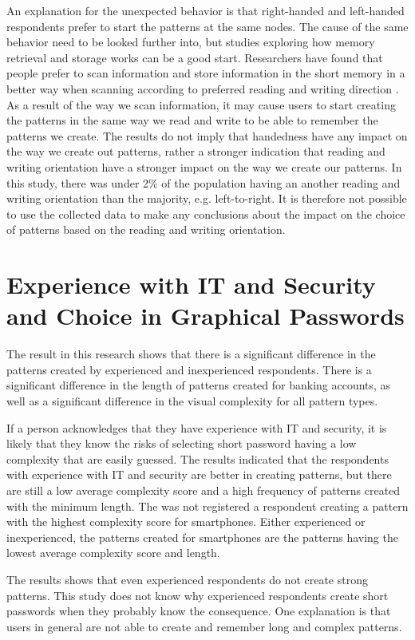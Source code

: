     An explanation for the unexpected behavior is that right-handed and left-handed respondents prefer to start the patterns at the same nodes. The cause of the same behavior need to be looked further into, but studies exploring how memory retrieval and storage works can be a good start. Researchers have found that people prefer to scan information and store information in the short memory in a better way when scanning according to preferred reading and writing direction \cite{Chan}. As a result of the way we scan information, it may cause users to start creating the patterns in the same way we read and write to be able to remember the patterns we create. The results do not imply that handedness have any impact on the way we create out patterns, rather a stronger indication that reading and writing orientation have a stronger impact on the way we create our patterns. In this study, there was under 2\% of the population having an another reading and writing orientation than the majority, e.g. left-to-right. It is therefore not possible to use the collected data to make any conclusions about the impact on the choice of patterns based on the reading and writing orientation.

  \section{Experience with IT and Security and Choice in Graphical Passwords}
    
    The result in this research shows that there is a significant difference in the patterns created by experienced and inexperienced respondents. There is a significant difference in the length of patterns created for banking accounts, as well as a significant difference in the visual complexity for all pattern types. 

    If a person acknowledges that they have experience with IT and security, it is likely that they know the risks of selecting short password having a low complexity that are easily guessed. The results indicated that the respondents with experience with IT and security are better in creating patterns, but there are still a low average complexity score and a high frequency of patterns created with the minimum length. The was not registered a respondent creating a pattern with the highest complexity score for smartphones. Either experienced or inexperienced, the patterns created for smartphones are the patterns having the lowest average complexity score and length.

    The results shows that even experienced respondents do not create strong patterns. This study does not know why experienced respondents create short passwords when they probably know the consequence. One explanation is that users in general are not able to create and remember long and complex patterns. 

